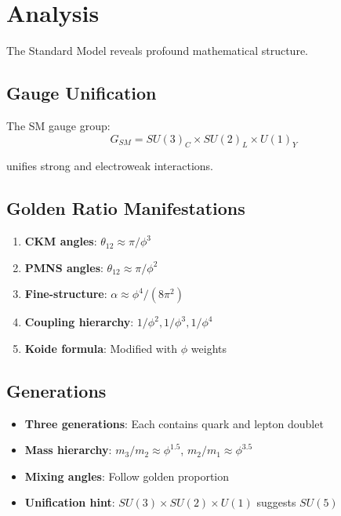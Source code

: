 \section{Analysis}

The Standard Model reveals profound mathematical structure.

\subsection{Gauge Unification}

\begin{theorem}
\label{thm:sm-symmetry}
The SM gauge group:
\begin{equation}
G_{SM} = SU(3)_C \times SU(2)_L \times U(1)_Y
\end{equation}

unifies strong and electroweak interactions.
\end{theorem}

\subsection{Golden Ratio Manifestations}

\begin{enumerate}
\item \textbf{CKM angles}: $\theta_{12} \approx \pi/\phi^3$
\item \textbf{PMNS angles}: $\theta_{12} \approx \pi/\phi^2$
\item \textbf{Fine-structure}: $\alpha \approx \phi^4/(8\pi^2)$
\item \textbf{Coupling hierarchy}: $1/\phi^2, 1/\phi^3, 1/\phi^4$
\item \textbf{Koide formula}: Modified with $\phi$ weights
\end{enumerate}

\subsection{Generations}

\begin{itemize}
\item \textbf{Three generations}: Each contains quark and lepton doublet
\item \textbf{Mass hierarchy}: $m_3/m_2 \approx \phi^{1.5}$, $m_2/m_1 \approx \phi^{3.5}$
\item \textbf{Mixing angles}: Follow golden proportion
\item \textbf{Unification hint}: $SU(3) \times SU(2) \times U(1)$ suggests $SU(5)$
\end{itemize}

